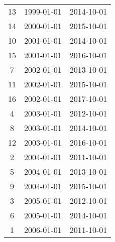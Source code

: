 % 
\begin{tabular}{ccc}
  \hline
  \hline
13 & 1999-01-01 & 2014-10-01 \\ 
  14 & 2000-01-01 & 2015-10-01 \\ 
  10 & 2001-01-01 & 2014-10-01 \\ 
  15 & 2001-01-01 & 2016-10-01 \\ 
  7 & 2002-01-01 & 2013-10-01 \\ 
  11 & 2002-01-01 & 2015-10-01 \\ 
  16 & 2002-01-01 & 2017-10-01 \\ 
  4 & 2003-01-01 & 2012-10-01 \\ 
  8 & 2003-01-01 & 2014-10-01 \\ 
  12 & 2003-01-01 & 2016-10-01 \\ 
  2 & 2004-01-01 & 2011-10-01 \\ 
  5 & 2004-01-01 & 2013-10-01 \\ 
  9 & 2004-01-01 & 2015-10-01 \\ 
  3 & 2005-01-01 & 2012-10-01 \\ 
  6 & 2005-01-01 & 2014-10-01 \\ 
  1 & 2006-01-01 & 2011-10-01 \\ 
   \hline
\end{tabular}
